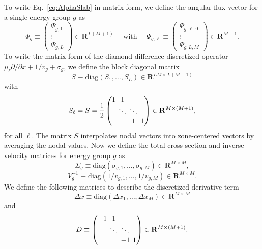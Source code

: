 To write Eq.~\ref{eq:AlphaSlab} in matrix form, we define the angular flux vector for a single energy group $g$ as
\begin{equation*}
\Psi_{g} \equiv 
\begin{pmatrix}
\Psi_{g,1} \\
\vdots \\
\Psi_{g,L}
\end{pmatrix} \in \mathbf{R}^{L(M+1)} \quad \text{ with } \quad
\Psi_{g, \ell} \equiv 
\begin{pmatrix}
\Psi_{g,\ell,0} \\
\vdots \\
\Psi_{g,L,M}
\end{pmatrix} \in \mathbf{R}^{M+1}.
\end{equation*}
To write the matrix form of the diamond difference discretized operator $\mu_{\ell} \partial/\partial x + 1/v_{g} + \sigma_{g}$, we define the block diagonal matrix
\begin{equation*}
\bar{S} \equiv \text{diag}(S_{1}, \dots, S_{L}) \in \mathbf{R}^{LM \times L(M+1)}
\end{equation*}
with
\begin{equation*}
S_{\ell} = S = \frac{1}{2}
\setlength\arraycolsep{2pt}
\begin{pmatrix}
1 & 1 & & \\
& \ddots & \ddots & \\
& & 1 & 1
\end{pmatrix} \in \mathbf{R}^{M \times (M+1)},
\end{equation*}
for all $\ell$. The matrix $S$ interpolates nodal vectors into zone-centered vectors by averaging the nodal values. Now we define the total cross section and inverse velocity matrices for energy group $g$ as
\begin{equation*}
	\Sigma_{g}  \equiv \text{diag}(\sigma_{g,1},\dots,\sigma_{g,M}) \in \mathbf{R}^{M \times M},
\end{equation*}
\begin{equation*}
	V^{-1}_{g}  \equiv \text{diag}(1/v_{g,1},\dots,1/v_{g,M}) \in \mathbf{R}^{M \times M}.
\end{equation*}
We define the following matrices to describe the discretized derivative term
\begin{equation*}
	\Delta x \equiv \text{diag}(\Delta x_{1}, \dots, \Delta x_{M}) \in \mathbf{R}^{M \times M}
\end{equation*}
and
\begin{equation*}
D \equiv
\setlength\arraycolsep{2pt}
\begin{pmatrix}
-1 & 1 & & \\
& \ddots & \ddots & \\
& & -1 & 1
\end{pmatrix} \in \mathbf{R}^{M \times (M+1)}.
\end{equation*}
